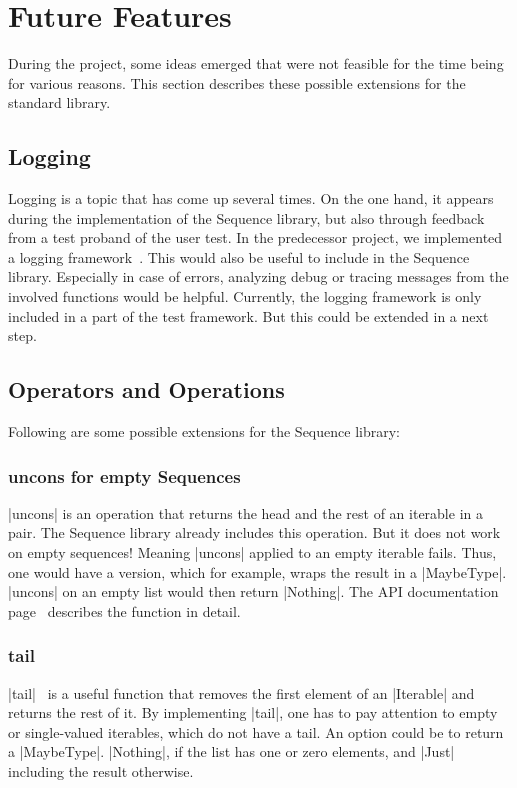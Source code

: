 \section{Future Features}
\label{sec:Future Features}
During the project, some ideas emerged that were not feasible for the time
being for various reasons. This section describes these possible extensions for
the standard library.

\subsection{Logging}
\label{sub:Logging}
Logging is a topic that has come up several times. On the one hand, it appears
during the implementation of the Sequence library, but also through feedback
from a test proband of the user test. In the predecessor project, we implemented
a logging framework~\cite{wild_ip5_2023}. This would also be useful to include
in the Sequence library. Especially in case of errors, analyzing debug or
tracing messages from the involved functions would be helpful. Currently, the
logging framework is only included in a part of the test framework. But this
could be extended in a next step.

\subsection{Operators and Operations}
\label{sub:Operators and Operations}
Following are some possible extensions for the Sequence library:

\subsubsection{uncons for empty Sequences}
\label{subsub:uncons}
|uncons| is an operation that returns the head and the rest of an iterable in a
pair. The Sequence library already includes this operation.
But it does not work on empty sequences! Meaning |uncons| applied to an
empty iterable fails. Thus, one would have a version, which for example, wraps the
result in a |MaybeType|. |uncons| on an empty list would then return |Nothing|.
The API documentation page~\cite{hoogle_uncons} describes the function in
detail.

\subsubsection{tail}
\label{subsub:tail}
|tail|~\cite{hoogle_tail} is a useful function that removes the first element
of an |Iterable| and returns the rest of it. By implementing |tail|, one has to
pay attention to empty or single-valued iterables, which do not have a tail. An
option could be to return a |MaybeType|. |Nothing|, if the list has one or zero
elements, and |Just| including the result otherwise.

